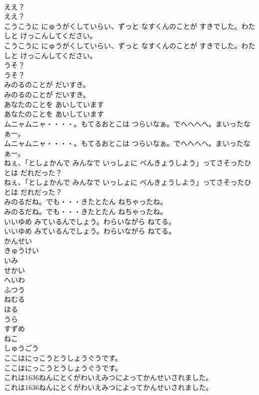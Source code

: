 \documentclass[8pt]{extreport}
\begin{document}
\begin{CJK}{UTF8}{min}
\\	ええ？	
\\	ええ？ 
\\	こうこうに にゅうがくしていらい、ずっと なすくんのことが すきでした。わたしと けっこんしてください。	
\\	こうこうに にゅうがくしていらい、ずっと なすくんのことが すきでした。わたしと けっこんしてください。 
\\	うそ？	
\\	うそ？ 
\\	みのるのことが だいすき。	
\\	みのるのことが だいすき。 
\\	あなたのことを あいしています	
\\	あなたのことを あいしています 
\\	ムニャムニャ・・・・。もてるおとこは つらいなぁ。でへへへへ。まいったなぁー。	
\\	ムニャムニャ・・・・。もてるおとこは つらいなぁ。でへへへへ。まいったなぁー。 
\\	ねぇ、「としょかんで みんなで いっしょに べんきょうしよう」ってさそったひとは だれだった？	
\\	ねぇ、「としょかんで みんなで いっしょに べんきょうしよう」ってさそったひとは だれだった？ 
\\	みのるだね。でも・・・きたとたん ねちゃったね。	
\\	みのるだね。でも・・・きたとたん ねちゃったね。 
\\	いいゆめ みているんでしょう。わらいながら ねてる。	
\\	いいゆめ みているんでしょう。わらいながら ねてる。 
\\	かんせい
\\	きゅうけい
\\	いみ
\\	せかい
\\	へいわ
\\	ふつう
\\	ねむる
\\	ほる
\\	うら
\\	すずめ
\\	ねこ
\\	しゅうごう
\\	ここはにっこうとうしょうぐうです。	
\\	ここはにっこうとうしょうぐうです。 
\\	これは1636ねんにとくがわいえみつによってかんせいされました。	
\\	これは1636ねんにとくがわいえみつによってかんせいされました。 

\end{CJK}
\end{document}

